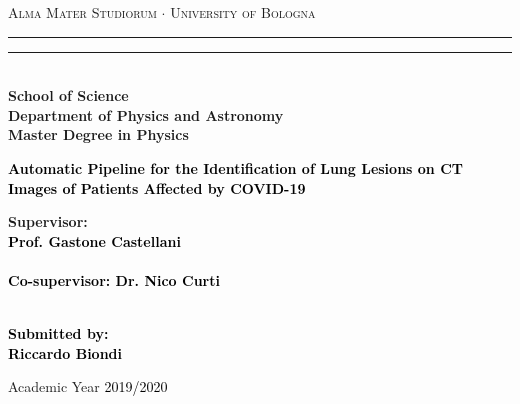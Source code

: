 \begin{titlepage}
%
%
%
%
\begin{center}
{{\Large{\textsc{Alma Mater Studiorum $\cdot$ University of  Bologna}}}} 
\rule[0.1cm]{15.8cm}{0.1mm}
\rule[0.5cm]{15.8cm}{0.6mm}
\\\vspace{3mm}
{\small{\bf School of Science \\
Department of Physics and Astronomy\\
Master Degree in Physics}}
\end{center}

\vspace{23mm}

\begin{center}\textcolor{black}{
%
%
{\LARGE{\bf Automatic Pipeline for the Identification of Lung Lesions on CT Images of Patients Affected by COVID-19}}\\
}\end{center}

\vspace{50mm} \par \noindent

\begin{minipage}[t]{0.49\textwidth}
%
%
{\large{\bf Supervisor: \vspace{2mm}\\\textcolor{black}{
Prof. Gastone Castellani}\\\\
%
%
%
\textcolor{black}{
\bf Co-supervisor:
\vspace{2mm}
Dr. Nico Curti\\\\}}}
\end{minipage}

%
\hfill
%
\begin{minipage}[t]{0.47\textwidth}\raggedleft \textcolor{black}{
{\large{\bf Submitted by:
\vspace{2mm}\\
%
%
\textcolor{black}{
Riccardo Biondi}}}
}
\end{minipage}

\vspace{40mm}

\begin{center}
%
%
Academic Year \textcolor{black}{ 2019/2020}
\end{center}

\end{titlepage}

